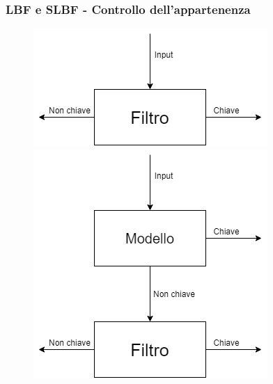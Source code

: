 \documentclass{beamer}
\begin{document}
\begin{frame}
    \frametitle{LBF e SLBF - Controllo dell'appartenenza}
    \begin{figure}[htbp]
        \centering
        \begin{minipage}{0.30\textwidth}
        \includegraphics[width=\textwidth]{immagini/5_2/bloomFilter.png}
        \end{minipage}%
        \hfill
        \begin{minipage}{0.30\textwidth}
        \includegraphics[width=\textwidth]{immagini/5_2/LBF.png}
        \end{minipage}
        \hfill
        \begin{minipage}{0.30\textwidth}

\end{minipage}
\end{figure}
\end{frame}
\end{document}
